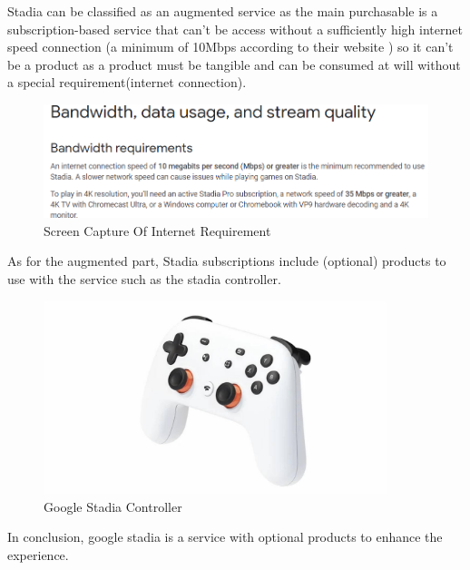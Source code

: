 Stadia can be classified as an augmented service as the main purchasable is a subscription-based service that can't be access without a sufficiently high internet speed connection (a minimum of 10Mbps according to their website \cite{stadiaSupport}) so it can't 
be a product as a product must be tangible and can be consumed at will without a special requirement(internet connection).

\begin{figure}[H]
    \centering
    \includegraphics[width=13cm]{images/bandwidth.png}
    \caption{Screen Capture Of Internet Requirement}
    \label{fig:internetReq}
\end{figure}

As for the augmented part, Stadia subscriptions include (optional) products to use 
with the service such as the stadia controller.

\begin{figure}[H]
    \centering
    \includegraphics[width=10cm]{images/controller.jpg}
    \caption{Google Stadia Controller}
    \label{fig:controller}
\end{figure}

In conclusion, google stadia is a service with optional products to enhance the 
experience.
